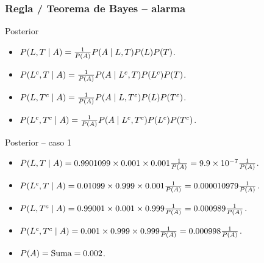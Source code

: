 \documentclass[table]{beamer}
\begin{document}
\begin{frame}
    \frametitle{Regla / Teorema de Bayes -- alarma}
    \begin{block}{Posterior}
        \begin{itemize}
            \item $\prob{L, T \mid A} = \frac{1}{\prob{A}} \prob{A \mid L, T} \prob{L} \prob{T}$.
            \item $\prob{L^{c}, T \mid A} = \frac{1}{\prob{A}} \prob{A \mid L^{c}, T} \prob{L^{c}} \prob{T}$.
            \item $\prob{L, T^{c} \mid A} = \frac{1}{\prob{A}} \prob{A \mid L, T^{c}} \prob{L} \prob{T^{c}}$.
            \item $\prob{L^{c}, T^{c} \mid A} = \frac{1}{\prob{A}} \prob{A \mid L^{c}, T^{c}} \prob{L^{c}} \prob{T^{c}}$.
        \end{itemize}
    \end{block}
    \begin{block}{Posterior -- caso 1}
        \begin{itemize}
            \item $\prob{L, T \mid A}
                = 0.9901099 \times 0.001 \times 0.001 \frac{1}{\prob{A}} = 9.9 \times 10^{-7} \frac{1}{\prob{A}}$.
            \item $\prob{L^{c}, T \mid A}
                = 0.01099 \times 0.999 \times 0.001 \frac{1}{\prob{A}} = 0.000010979 \frac{1}{\prob{A}}$.
            \item $\prob{L, T^{c} \mid A}
                = 0.99001 \times 0.001 \times 0.999 \frac{1}{\prob{A}} = 0.000989 \frac{1}{\prob{A}}$.
            \item $\prob{L^{c}, T^{c} \mid A}
                = 0.001 \times 0.999 \times 0.999 \frac{1}{\prob{A}} = 0.000998 \frac{1}{\prob{A}}$.
            \item $\prob{A} = \text{Suma} = 0.002$.
        \end{itemize}
    \end{block}
\end{frame}
\end{document}
